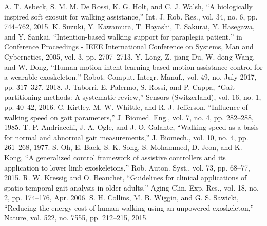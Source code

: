 \documentclass[paper,JRM,paper]{jaciiiarticle}
\begin{document}
\begin{thebibliography}{99}
	A. T. Asbeck, S. M. M. De Rossi, K. G. Holt, and C. J. Walsh, “A biologically inspired soft exosuit for walking assistance,” Int. J. Rob. Res., vol. 34, no. 6, pp. 744–762, 2015.
	K. Suzuki, Y. Kawamura, T. Hayashi, T. Sakurai, Y. Hasegawa, and Y. Sankai, “Intention-based walking support for paraplegia patient,” in Conference Proceedings - IEEE International Conference on Systems, Man and Cybernetics, 2005, vol. 3, pp. 2707–2713.
	Y. Long, Z. jiang Du, W. dong Wang, and W. Dong, “Human motion intent learning based motion assistance control for a wearable exoskeleton,” Robot. Comput. Integr. Manuf., vol. 49, no. July 2017, pp. 317–327, 2018.
	J. Taborri, E. Palermo, S. Rossi, and P. Cappa, “Gait partitioning methods: A systematic review,” Sensors (Switzerland), vol. 16, no. 1, pp. 40–42, 2016.
	C. Kirtley, M. W. Whittle, and R. J. Jefferson, “Influence of walking speed on gait parameters,” J. Biomed. Eng., vol. 7, no. 4, pp. 282–288, 1985.
	T. P. Andriacchi, J. A. Ogle, and J. O. Galante, “Walking speed as a basis for normal and abnormal gait measurements,” J. Biomech., vol. 10, no. 4, pp. 261–268, 1977.
	S. Oh, E. Baek, S. K. Song, S. Mohammed, D. Jeon, and K. Kong, “A generalized control framework of assistive controllers and its application to lower limb exoskeletons,” Rob. Auton. Syst., vol. 73, pp. 68–77, 2015.
	R. W. Kressig and O. Beauchet, “Guidelines for clinical applications of spatio-temporal gait analysis in older adults,” Aging Clin. Exp. Res., vol. 18, no. 2, pp. 174–176, Apr. 2006.
	S. H. Collins, M. B. Wiggin, and G. S. Sawicki, “Reducing the energy cost of human walking using an unpowered exoskeleton,” Nature, vol. 522, no. 7555, pp. 212–215, 2015.

\end{thebibliography}
\end{document}

